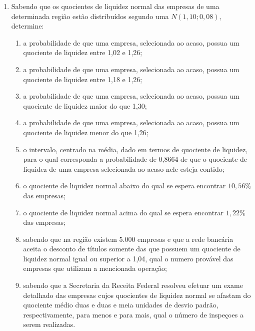 \begin{enumerate}[resume]
\item Sabendo que os quocientes de liquidez normal das empresas de uma determinada região estão distribuídos segundo uma $N( 1,10 ; 0,08)$, determine:
	\begin{enumerate}
	\item a probabilidade de que uma empresa, selecionada ao acaso, possua um quociente de liquidez entre 1,02 e 1,26;
	\item a probabilidade de que uma empresa, selecionada ao acaso, possua um quociente de liquidez entre 1,18 e 1,26;
	\item a probabilidade de que uma empresa, selecionada ao acaso, possua um quociente de liquidez maior do que 1,30;
	\item a probabilidade de que uma empresa, selecionada ao acaso, possua um quociente de liquidez menor do que 1,26;
	\item o intervalo, centrado na média, dado em termos de quociente de liquidez, para o qual corresponda a probabilidade de 0,8664 de que o quociente de liquidez de uma empresa selecionada ao acaso nele esteja contido;
	\item o quociente de liquidez normal abaixo do qual se espera encontrar $10,56\%$ das empresas;
	\item o quociente de liquidez normal acima do qual se espera encontrar $1,22\%$ das empresas;
	\item sabendo que na região existem 5.000 empresas e que a rede bancária aceita o desconto de títulos somente das que possuem um quociente de liquidez normal igual ou superior a 1,04, qual o numero provável das empresas que utilizam a mencionada operação;
	\item sabendo que a Secretaria da Receita Federal resolveu efetuar um exame detalhado das empresas cujos quocientes de liquidez normal se afastam do quociente médio duas e duas e meia unidades de desvio padrão, respectivamente, para menos e para mais, qual o número de inspeçoes a serem realizadas.
	\end{enumerate}
\end{enumerate}